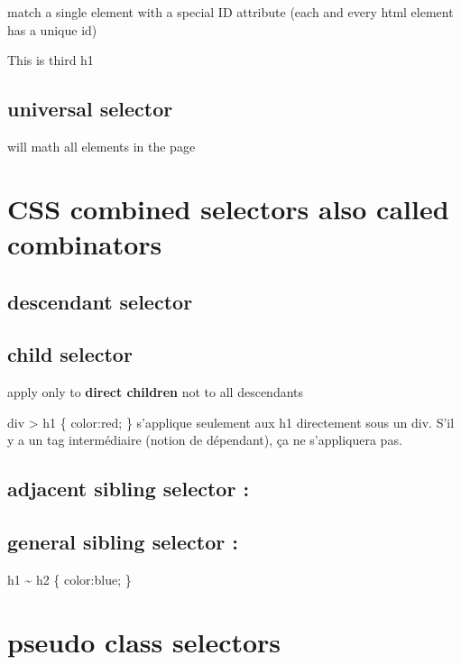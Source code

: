 \documentclass[
]{book}
\begin{document}
match a single element with a special ID attribute
(each and every html element has a unique id)

This is third h1

\hypertarget{universal-selector}{%
\subsection{universal selector}\label{universal-selector}}

will math all elements in the page

\hypertarget{css-combined-selectors-also-called-combinators}{%
\section{CSS combined selectors also called combinators}\label{css-combined-selectors-also-called-combinators}}

\hypertarget{descendant-selector}{%
\subsection{descendant selector}\label{descendant-selector}}

\hypertarget{child-selector}{%
\subsection{child selector}\label{child-selector}}

apply only to \textbf{direct children} not to all descendants

div \textgreater{} h1 \{
color:red;
\}
s'applique seulement aux h1 directement sous un div. S'il y a un tag intermédiaire (notion de dépendant), ça ne s'appliquera pas.

\hypertarget{adjacent-sibling-selector}{%
\subsection{adjacent sibling selector :}\label{adjacent-sibling-selector}}

\hypertarget{general-sibling-selector}{%
\subsection{general sibling selector :}\label{general-sibling-selector}}

h1 \textasciitilde{} h2 \{
color:blue;
\}

\hypertarget{pseudo-class-selectors}{%
\section{pseudo class selectors}\label{pseudo-class-selectors}}
\end{document}
